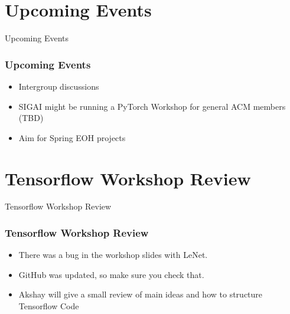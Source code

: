 \documentclass{beamer}
\begin{document}
\section{Upcoming Events}
\begin{frame}
  \huge{\centerline{Upcoming Events}}
\end{frame}
\begin{frame}
  \frametitle{Upcoming Events}
  \begin{itemize}
  \item Intergroup discussions
  \item SIGAI might be running a PyTorch Workshop for general ACM members (TBD)
  \item Aim for Spring EOH projects
  \end{itemize}
\end{frame}

\section{Tensorflow Workshop Review}
\begin{frame}
  \huge{\centerline{Tensorflow Workshop Review}}
\end{frame}
\begin{frame}
  \frametitle{Tensorflow Workshop Review}
  \begin{itemize}
  \item There was a bug in the workshop slides with LeNet.
  \item GitHub was updated, so make sure you check that.
  \item Akshay will give a small review of main ideas and how to structure Tensorflow Code
  \end{itemize}
\end{frame}


\end{document}
